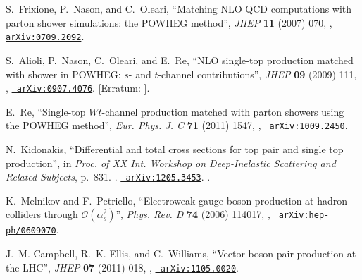 \documentclass[12pt]{thesis}  %
\begin{document}
\begin{thebibliography}{100}
\hrefCMSnoop {} {S.~Frixione, P.~Nason, and C.~Oleari, ``Matching {NLO QCD}
  computations with parton shower simulations: the {POWHEG} method'',} \textit{
  JHEP} \textbf{ 11} (2007) 070,
  \href{http://dx.doi.org/10.1088/1126-6708/2007/11/070}{},
  \href{http://www.arXiv.org/abs/0709.2092}{\texttt{ arXiv:0709.2092}}.

\hrefCMSnoop {} {S.~Alioli, P.~Nason, C.~Oleari, and E.~Re, ``{NLO single-top
  production matched with shower in POWHEG: $s$- and $t$-channel
  contributions}'',} \textit{ JHEP} \textbf{ 09} (2009) 111,
  \href{http://dx.doi.org/10.1088/1126-6708/2009/09/111}{},
  \href{http://www.arXiv.org/abs/0907.4076}{\texttt{ arXiv:0907.4076}}.
[Erratum: ].

\hrefCMSnoop {} {E.~Re, ``{Single-top $Wt$-channel production matched with
  parton showers using the POWHEG method}'',} \textit{ Eur. Phys. J. C}
  \textbf{ 71} (2011) 1547,
  \href{http://dx.doi.org/10.1140/epjc/s10052-011-1547-z}{},
\href{http://www.arXiv.org/abs/1009.2450}{\texttt{ arXiv:1009.2450}}.

\hrefCMSnoop {} {N.~Kidonakis, ``{Differential and total cross sections for top
  pair and single top production}'',} in \textit{ Proc. of {XX} Int. Workshop
  on Deep-Inelastic Scattering and Related Subjects}, p.~831.
.
\newblock \href{http://www.arXiv.org/abs/1205.3453}{\texttt{ arXiv:1205.3453}}.
\newblock
\href{http://dx.doi.org/10.3204/DESY-PROC-2012-02/251}{}.

\hrefCMSnoop {} {K.~Melnikov and F.~Petriello, ``Electroweak gauge boson
  production at hadron colliders through $\mathcal{O}(\alpha_{s}^2)$'',}
  \textit{ Phys. Rev. D} \textbf{ 74} (2006) 114017,
  \href{http://dx.doi.org/10.1103/PhysRevD.74.114017}{},
  \href{http://www.arXiv.org/abs/hep-ph/0609070}{\texttt{
  arXiv:hep-ph/0609070}}.

\hrefCMSnoop {} {J.~M. Campbell, R.~K. Ellis, and C.~Williams, ``Vector boson
  pair production at the {LHC}'',} \textit{ JHEP} \textbf{ 07} (2011) 018,
  \href{http://dx.doi.org/10.1007/JHEP07(2011)018}{},
  \href{http://www.arXiv.org/abs/1105.0020}{\texttt{ arXiv:1105.0020}}.


\end{thebibliography}
\end{document}
